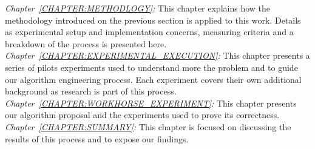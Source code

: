 \emph{Chapter~\ref{CHAPTER:METHODLOGY}:} This chapter explains how the methodology introduced on the previous section is applied to this work. Details as experimental setup and implementation concerns,
measuring criteria and a breakdown of the process is presented here.\\

\emph{Chapter~\ref{CHAPTER:EXPERIMENTAL_EXECUTION}:} This chapter presents a series of pilots experiments used to understand more the problem and to guide our algorithm engineering process. Each experiment covers their own additional background as research is part of this process.\\

\emph{Chapter~\ref{CHAPTER:WORKHORSE_EXPERIMENT}:} This chapter presents our algorithm proposal and the experiments used to prove its correctness.\\

\emph{Chapter~\ref{CHAPTER:SUMMARY}:} This chapter is focused on discussing the results of this process and to expose our findings.